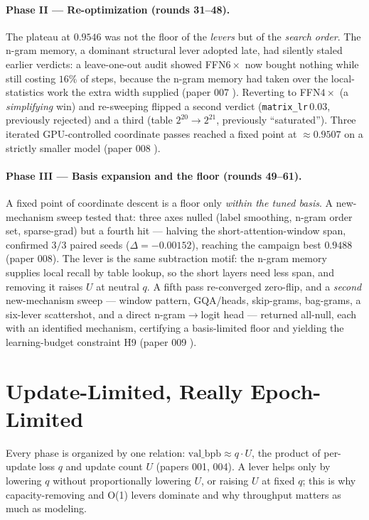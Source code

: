 \documentclass{article}
\newcommand{\valbpb}{\mathrm{val\_bpb}}
\begin{document}
\paragraph{Phase II --- Re-optimization (rounds 31--48).} The plateau at $0.9546$ was not the floor of the \emph{levers} but of the \emph{search order}. The n-gram memory, a dominant structural lever adopted late, had silently staled earlier verdicts: a leave-one-out audit showed FFN$6\times$ now bought nothing while still costing $16\%$ of steps, because the n-gram memory had taken over the local-statistics work the extra width supplied (paper 007 \cite{ophis2026staleness}). Reverting to FFN$4\times$ (a \emph{simplifying} win) and re-sweeping flipped a second verdict (\texttt{matrix\_lr}\,$0.03$, previously rejected) and a third (table $2^{20}\to2^{21}$, previously ``saturated''). Three iterated GPU-controlled coordinate passes reached a fixed point at $\approx0.9507$ on a strictly smaller model (paper 008 \cite{ophis2026convergence}).

\paragraph{Phase III --- Basis expansion and the floor (rounds 49--61).} A fixed point of coordinate descent is a floor only \emph{within the tuned basis}. A new-mechanism sweep tested that: three axes nulled (label smoothing, n-gram order set, sparse-grad) but a fourth hit --- halving the short-attention-window span, confirmed $3/3$ paired seeds ($\Delta=-0.00152$), reaching the campaign best $0.9488$ (paper 008). The lever is the same subtraction motif: the n-gram memory supplies local recall by table lookup, so the short layers need less span, and removing it raises $U$ at neutral $q$. A fifth pass re-converged zero-flip, and a \emph{second} new-mechanism sweep --- window pattern, GQA/heads, skip-grams, bag-grams, a six-lever scattershot, and a direct n-gram$\to$logit head --- returned all-null, each with an identified mechanism, certifying a basis-limited floor and yielding the learning-budget constraint H9 (paper 009 \cite{ophis2026floor}).

\section{Update-Limited, Really Epoch-Limited}
\label{sec:regime}

Every phase is organized by one relation: $\valbpb\approx q\cdot U$, the product of per-update loss $q$ and update count $U$ (papers 001, 004). A lever helps only by lowering $q$ without proportionally lowering $U$, or raising $U$ at fixed $q$; this is why capacity-removing and O(1) levers dominate and why throughput matters as much as modeling.
\end{document}
